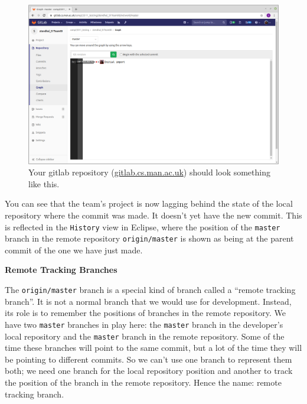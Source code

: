 \documentclass[
]{book}
\begin{document}
\begin{figure}

{\centering \includegraphics[width=1\linewidth]{images/commitGraphInGitLabBeforePushNoHistory} 

}

\caption{Your gitlab repository (\href{https://gitlab.cs.man.ac.uk}{gitlab.cs.man.ac.uk}) should look something like this.}\label{fig:commitGraphInGitLabBeforePushNoHistory-fig}
\end{figure}



You can see that the team's project is now lagging behind the state of the local repository where the commit was made. It doesn't yet have the new commit. This is reflected in the \texttt{History} view in Eclipse, where the position of the \texttt{master} branch in the remote repository \texttt{origin/master} is shown as being at the parent commit of the one we have just made.

\textbf{Remote Tracking Branches}

The \texttt{origin/master} branch is a special kind of branch called a ``remote tracking branch''. It is not a normal branch that we would use for development. Instead, its role is to remember the positions of branches in the remote repository. We have two \texttt{master} branches in play here: the \texttt{master} branch in the developer's local repository and the \texttt{master} branch in the remote repository. Some of the time these branches will point to the same commit, but a lot of the time they will be pointing to different commits. So we can't use one branch to represent them both; we need one branch for the local repository position and another to track the position of the branch in the remote repository. Hence the name: remote tracking branch.
\end{document}
